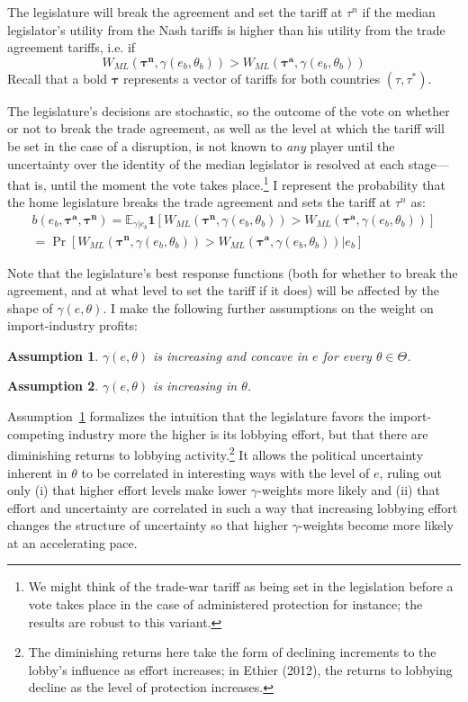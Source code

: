 \documentclass[10pt]{article}
\newtheorem{assumption}{Assumption}
\newcommand{\ve}{\theta}
\newcommand{\ta}{\theta}
\newcommand{\expect}{\mathbb{E}}
\newcommand{\bta}{\bm{\tau^a}}
\newcommand{\btn}{\bm{\tau^n}}
\newcommand{\ga}{\gamma}
\begin{document}
The legislature will break the agreement and set the tariff at $\tau^n$ if the median legislator's utility from the Nash tariffs is higher than his utility from the trade agreement tariffs, i.e. if
\begin{equation}
  W_{ML}(\btn,\ga(e_b,\ve_b)) > W_{ML}\left(\bta,\ga(e_b,\ve_b)\right)
  \label{eq:lwcg}
\end{equation}
\noindent Recall that a bold $\bm{\tau}$ represents a vector of tariffs for both countries $(\tau,\tau^*)$.
  
The legislature's decisions are stochastic, so the outcome of the vote on whether or not to break the trade agreement, as well as the level at which the tariff will be set in the case of a disruption, is not known to \textit{any} player until the uncertainty over the identity of the median legislator is resolved at each stage---that is, until the moment the vote takes place.\footnote{We might think of the trade-war tariff as being set in the legislation before a vote takes place in the case of administered protection for instance; the results are robust to this variant.} I represent the probability that the home legislature breaks the trade agreement and sets the tariff at $\tau^n$ as:
\begin{multline}
  b(e_b,\bta,\btn) = \expect_{\ga|e_b} \bm{1} [ W_{ML}(\btn,\ga(e_b,\ve_b)) > W_{ML}\left(\bta,\ga(e_b,\ve_b)\right) ] \\ = \Pr [ W_{ML}(\btn,\ga(e_b,\ve_b)) > W_{ML}\left(\bta,\ga(e_b,\ve_b)\right) | e_b]
  \label{eq:b}
\end{multline}

Note that the legislature's best response functions (both for whether to break the agreement, and at what level to set the tariff if it does) will be affected by the shape of $\ga(e,\ve)$. I make the following further assumptions on the weight on import-industry profits:

\begin{assumption}
  $\ga(e,\ta)$ is increasing and concave in $e$ for every $\ta \in \Theta$.
  \label{as:ga_c}
\end{assumption}

\begin{assumption}
  $\ga(e,\ta)$ is increasing in $\ta$.
  \label{as:ga_ta}
\end{assumption}

Assumption~\ref{as:ga_c} formalizes the intuition that the legislature favors the import-competing industry more the higher is its lobbying effort, but that there are diminishing returns to lobbying activity.\footnote{The diminishing returns here take the form of declining increments to the lobby's influence as effort increases; in Ethier (2012), the returns to lobbying decline as the level of protection increases.} It allows the political uncertainty inherent in $\ta$ to be correlated in interesting ways with the level of $e$, ruling out only (i) that higher effort levels make lower $\ga$-weights more likely and (ii) that effort and uncertainty are correlated in such a way that increasing lobbying effort changes the structure of uncertainty so that higher $\ga$-weights become more likely at an accelerating pace.
\end{document}
